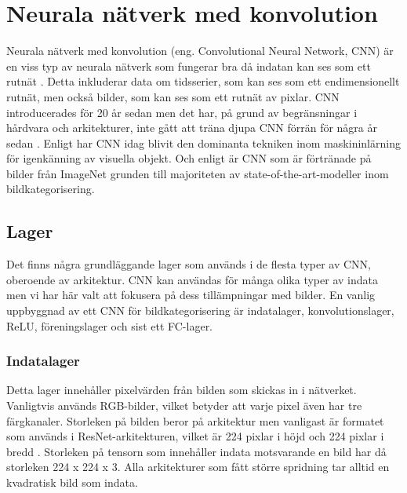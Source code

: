 \documentclass[]{kththesis}
\begin{document}
\section{Neurala nätverk med konvolution}
Neurala nätverk med konvolution (eng. Convolutional Neural Network, CNN) är en viss typ av neurala nätverk som fungerar bra då indatan kan ses som ett rutnät \parencite{Goodfellow-et-al-2016}. Detta inkluderar data om tidsserier, som kan ses som ett endimensionellt rutnät, men också bilder, som kan ses som ett rutnät av pixlar. CNN introducerades för 20 år sedan men det har, på grund av begränsningar i hårdvara och arkitekturer, inte gått att träna djupa CNN förrän för några år sedan \parencite{huang2017densely}. Enligt \textcite{huang2017densely} har CNN idag blivit den dominanta tekniken inom maskininlärning för igenkänning av visuella objekt. Och enligt \textcite{simon2016imagenet} är CNN som är förtränade på bilder från ImageNet grunden till majoriteten av state-of-the-art-modeller inom bildkategorisering.

\subsection{Lager}
Det finns några grundläggande lager som används i de flesta typer av CNN, oberoende av arkitektur. CNN kan användas för många olika typer av indata men vi har här valt att fokusera på dess tillämpningar med bilder. En vanlig uppbyggnad av ett CNN för bildkategorisering är indatalager, konvolutionslager, ReLU, föreningslager och sist ett FC-lager.

\subsubsection{Indatalager}
Detta lager innehåller pixelvärden från bilden som skickas in i nätverket. Vanligtvis används RGB-bilder, vilket betyder att varje pixel även har tre färgkanaler. Storleken på bilden beror på arkitektur men vanligast är formatet som används i ResNet-arkitekturen, vilket är 224 pixlar i höjd och 224 pixlar i bredd \parencite{krizhevsky2012imagenet}. Storleken på tensorn som innehåller indata motsvarande en bild har då storleken 224 x 224 x 3. Alla arkitekturer som fått större spridning tar alltid en kvadratisk bild som indata.
\end{document}
